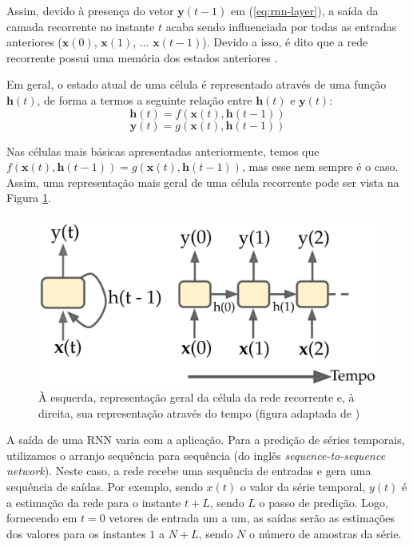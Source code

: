 \documentclass[a4paper, 12pt]{article}
\begin{document}
Assim, devido à presença do vetor $\mathbf{y}(t-1)$ em (\ref{eq:rnn-layer}), a saída da camada recorrente no instante $t$ acaba sendo influenciada por todas as entradas anteriores ($\mathbf{x}(0)$, $\mathbf{x}(1)$, ... $\mathbf{x}(t-1)$). Devido a isso, é dito que a rede recorrente possui uma memória dos estados anteriores \cite{geron2019hands}. 

Em geral, o estado atual de uma célula é representado através de uma função $\mathbf{h}(t)$, de forma a termos a seguinte relação entre $\mathbf{h}(t)$ e $\mathbf{y}(t)$:
\begin{equation}
	\mathbf{h}(t) = f(\mathbf{x}(t), \mathbf{h}(t-1))
\end{equation}
\begin{equation}
	\mathbf{y}(t) = g(\mathbf{x}(t), \mathbf{h}(t-1))
\end{equation}

Nas células mais básicas apresentadas anteriormente, temos que $f(\mathbf{x}(t), \mathbf{h}(t-1)) = g(\mathbf{x}(t), \mathbf{h}(t-1))$, mas esse nem sempre é o caso. Assim, uma representação mais geral de uma célula recorrente pode ser vista na Figura \ref{fig:recorrente-cell-geral}.
\begin{figure}[!ht]
\centering
\includegraphics[scale = 0.25]{rnn-cell-general.pdf}
\caption{À esquerda, representação geral da célula da rede recorrente e, à direita, sua representação através do tempo (figura adaptada de \cite{geron2019hands})}
\label{fig:recorrente-cell-geral}
\end{figure}

A saída de uma RNN varia com a aplicação. Para a predição de séries temporais, utilizamos o arranjo sequência para sequência (do inglês \textit{sequence-to-sequence network}). Neste caso, a rede recebe uma sequência de entradas e gera uma sequência de saídas. Por exemplo, sendo $x(t)$ o valor da série temporal, $y(t)$ é a estimação da rede para o instante $t + L$, sendo $L$ o passo de predição. Logo, fornecendo em $t=0$ vetores de entrada um a um, as saídas serão as estimações dos valores para os instantes $1$ a $N + L$, sendo $N$ o número de amostras da série. 
\end{document}
